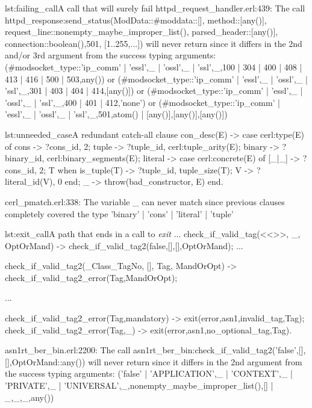

\begin{console}{lst:failing_call}{A call that will surely fail}
httpd_request_handler.erl:439: The call
httpd_response:send_status(ModData::#mod{data::[], method::[any()],
  request_line::nonempty_maybe_improper_list(),
  parsed_header::[any()], connection::boolean()},501, [1..255,...])
will never return since it differs in the 2nd and/or 3rd argument from
the success typing arguments: (#mod{socket_type::'ip_comm' |
  {'essl',_} | {'ossl',_} | {'ssl',_}},100 | 304 | 400 | 408 | 413 |
416 | 500 | 503,any()) or (#mod{socket_type::'ip_comm' | {'essl',_} |
  {'ossl',_} | {'ssl',_}},301 | 403 | 404 | 414,[any()]) or
(#mod{socket_type::'ip_comm' | {'essl',_} | {'ossl',_} |
  {'ssl',_}},400 | 401 | 412,'none') or (#mod{socket_type::'ip_comm' |
  {'essl',_} | {'ossl',_} | {'ssl',_}},501,{atom() |
  [any()],[any()],[any()]})

\end{console}

\begin{console}{lst:unneeded_case}{A redundant catch-all clause}
con_desc(E) ->
    case cerl:type(E) of
	cons -> {?cons_id, 2};
	tuple -> {?tuple_id, cerl:tuple_arity(E)};
	binary -> {?binary_id, cerl:binary_segments(E)};
	literal ->
	    case cerl:concrete(E) of
		[_|_] -> {?cons_id, 2};
		T when is_tuple(T) -> {?tuple_id, tuple_size(T)};
		V -> {?literal_id(V), 0}
	    end;
	_ ->
	    throw({bad_constructor, E})
    end.


cerl_pmatch.erl:338: The variable _ can never match since previous clauses
completely covered the type 'binary' | 'cons' | 'literal' | 'tuple'
\end{console}

\begin{console}{lst:exit_call}{A path that ends in a call to \emph{exit}}
...
check_if_valid_tag(<<>>, _, OptOrMand) ->
    check_if_valid_tag2(false,[],[],OptOrMand);
...

check_if_valid_tag2(_Class_TagNo, [], Tag, MandOrOpt) ->
    check_if_valid_tag2_error(Tag,MandOrOpt);

...

check_if_valid_tag2_error(Tag,mandatory) ->
    exit({error,{asn1,{invalid_tag,Tag}}});
check_if_valid_tag2_error(Tag,_) ->
    exit({error,{asn1,{no_optional_tag,Tag}}}).


asn1rt_ber_bin.erl:2200: The call
asn1rt_ber_bin:check_if_valid_tag2('false',[],[],OptOrMand::any()) will never
return since it differs in the 2nd argument from the success typing arguments:
('false' | {'APPLICATION',_} | {'CONTEXT',_} | {'PRIVATE',_} |
{'UNIVERSAL',_},nonempty_maybe_improper_list(),[] | {_,_,_},any())
\end{console}

